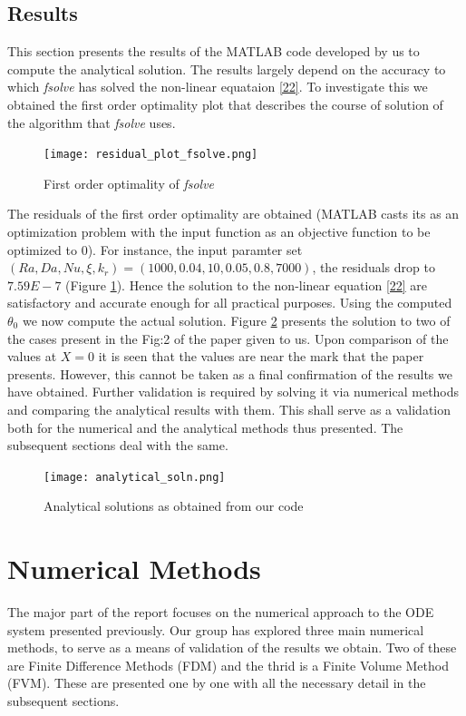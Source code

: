 \documentclass[12pt]{article}
\begin{document}
\subsection{Results}
This section presents the results of the MATLAB code developed by us to compute the analytical solution. The results largely depend on the accuracy to which \emph{fsolve} has solved the non-linear equataion \eqref{22}. To investigate this we obtained the first order optimality plot that describes the course of solution of the algorithm that \emph{fsolve} uses. 
\begin{figure}[h]
    \centering
    \texttt{[image: residual\_plot\_fsolve.png]}
    \caption{First order optimality of \emph{fsolve}}
    \label{fig:1}
\end{figure}
The residuals of the first order optimality are obtained (MATLAB casts its as an optimization problem with the input function as an objective function to be optimized to 0). For instance, the input paramter set $(Ra, Da, Nu, \xi, k_r) = (1000, 0.04, 10, 0.05, 0.8, 7000)$, the residuals drop to $7.59E-7$ (Figure \ref{fig:1}). Hence the solution to the non-linear equation \eqref{22} are satisfactory and accurate enough for all practical purposes. Using the computed $\theta_0$ we now compute the actual solution. Figure \ref{fig:2} presents the solution to two of the cases present in the Fig:2 of the paper given to us. Upon comparison of the values at $X=0$ it is seen that the values are near the mark that the paper presents. However, this cannot be taken as a final confirmation of the results we have obtained. Further validation is required by solving it via numerical methods and comparing the analytical results with them. This shall serve as a validation both for the numerical and the analytical methods thus presented. The subsequent sections deal with the same.
\begin{figure}[h]
    \centering
    \texttt{[image: analytical\_soln.png]}
    \caption{Analytical solutions as obtained from our code}
    \label{fig:2}
\end{figure}
\section{Numerical Methods}
The major part of the report focuses on the numerical approach to the ODE system presented previously. Our group has explored three main numerical methods, to serve as a means of validation of the results we obtain. Two of these are Finite Difference Methods (FDM) and the thrid is a Finite Volume Method (FVM). These are presented one by one with all the necessary detail in the subsequent sections. 
\end{document}
